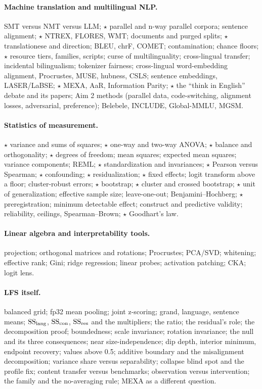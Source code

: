 \paragraph{Machine translation and multilingual NLP.}
SMT versus NMT versus LLM; $\star$ parallel and n-way parallel corpora;
sentence alignment; $\star$ NTREX, FLORES, WMT; documents and purged splits;
$\star$ translationese and direction; BLEU, chrF, COMET; contamination;
chance floors; $\star$ resource tiers, families, scripts; curse of
multilinguality; cross-lingual transfer; incidental bilingualism; tokenizer
fairness; cross-lingual word-embedding alignment, Procrustes, MUSE, hubness,
CSLS; sentence embeddings, LASER/LaBSE; $\star$ MEXA, AaR, Information
Parity; $\star$ the ``think in English'' debate and its papers; Aim 2
methods (parallel data, code-switching, alignment losses, adversarial,
preference); Belebele, INCLUDE, Global-MMLU, MGSM.

\paragraph{Statistics of measurement.}
$\star$ variance and sums of squares; $\star$ one-way and two-way ANOVA;
$\star$ balance and orthogonality; $\star$ degrees of freedom; mean squares;
expected mean squares; variance components; REML; $\star$ standardization
and invariances; $\star$ Pearson versus Spearman; $\star$ confounding;
$\star$ residualization; $\star$ fixed effects; logit transform above a
floor; cluster-robust errors; $\star$ bootstrap; $\star$ cluster and crossed
bootstrap; $\star$ unit of generalization; effective sample size;
leave-one-out; Benjamini--Hochberg; $\star$ preregistration; minimum
detectable effect; construct and predictive validity; reliability,
ceilings, Spearman--Brown; $\star$ Goodhart's law.

\paragraph{Linear algebra and interpretability tools.}
projection; orthogonal matrices and rotations; Procrustes; PCA/SVD;
whitening; effective rank; Gini; ridge regression; linear probes; activation
patching; CKA; logit lens.

\paragraph{LFS itself.}
balanced grid; fp32 mean pooling; joint z-scoring; grand, language, sentence
means; $\mathrm{SS}_{\mathrm{lang}}$, $\mathrm{SS}_{\mathrm{con}}$, $\mathrm{SS}_{\mathrm{res}}$ and the multipliers; the ratio; the residual's
role; the decomposition proof; boundedness; scale invariance; rotation
invariance; the null and its three consequences; near size-independence; dip
depth, interior minimum, endpoint recovery; values above 0.5; additive
boundary and the misalignment decomposition; variance share versus separability;
collapse blind spot and the profile fix; content transfer versus benchmarks;
observation versus intervention; the family and the no-averaging rule; MEXA
as a different question.

